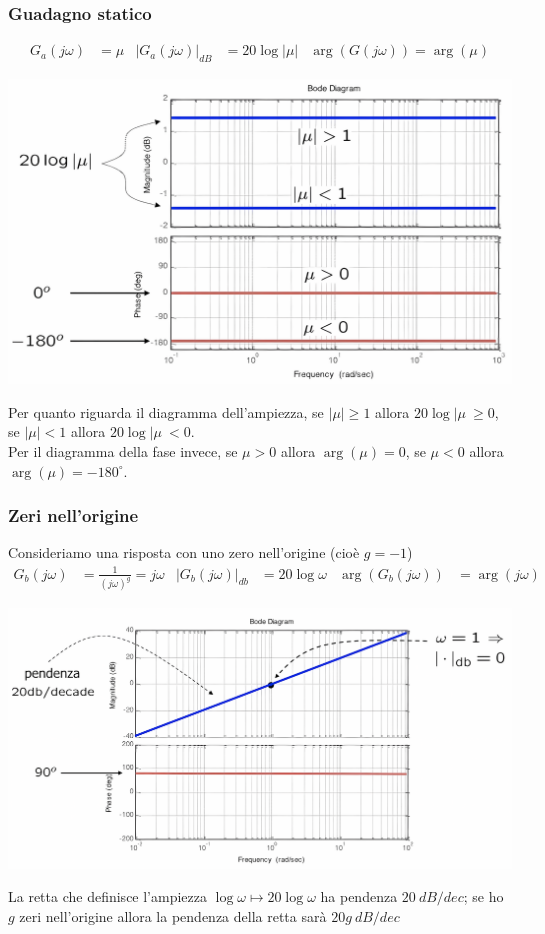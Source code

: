 \documentclass{article}
\numberwithin{equation}{subsection}
\begin{document}
\subsubsection{Guadagno statico}
\begin{align*}
    G_a(j\omega) &=\mu & |G_a(j\omega)|_{dB} &= 20\log|\mu| & \arg(G(j\omega)) = \arg(\mu)
\end{align*}
\begin{center}
    \includegraphics[scale=0.125]{Images/Diagramma_guadagno_statico_1.png}
\end{center}
Per quanto riguarda il diagramma dell'ampiezza, se $|\mu| \geq 1$ allora $20\log|\mu\ \geq 0$, se $|\mu| <1$ allora $20\log|\mu\ < 0$.\\
Per il diagramma della fase invece, se $\mu >0$ allora $\arg(\mu)=0$, se $\mu <0$ allora $\arg(\mu)=-180^\circ$.


\subsubsection{Zeri nell'origine}
Consideriamo una risposta con uno zero nell'origine (cioè $g=-1$)
\begin{align*}
    G_b(j\omega) &= \frac{1}{(j\omega)^g} = j\omega & |G_b(j\omega)|_{db} &= 20 \log \omega & \arg(G_b(j \omega)) &= \arg(j\omega)
\end{align*}
\begin{center}
    \includegraphics[scale=0.125]{Images/Diagramma_zero_origine.png}
\end{center}
La retta che definisce l'ampiezza $\log \omega \mapsto 20 \log \omega$ ha pendenza $20 \ dB/dec$; se ho $g$ zeri nell'origine allora la pendenza della retta sarà $20g \ dB/dec$
\end{document}
